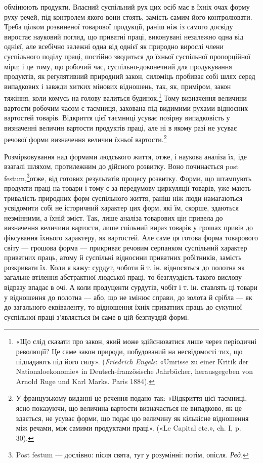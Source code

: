 \parcont{}  %
обмінюють продукти. Власний суспільний рух цих осіб має в
їхніх очах форму руху речей, під контролем якого вони стоять,
замість самим його контролювати. Треба цілком розвиненої товарової
продукції, раніш ніж із самого досвіду виростає науковий
погляд, що приватні праці, виконувані незалежно одна від однієї,
але всебічно залежні одна від однієї як природно вирослі члени
суспільного поділу праці, постійно зводиться до їхньої суспільної
пропорційної міри; і це тому, що робочий час, суспільно-доконечний
для продукування продуктів, як реґулятивний природний
закон, силоміць пробиває собі шлях серед випадкових і завжди
хитких мінових відношень, так, як, приміром, закон тяжіння,
коли комусь на голову валиться будинок.\footnote{
«Що слід сказати про закон, який може здійснюватися лише
через періодичні революції? Це саме закон природи, побудований на
несвідомості тих, що підпадають під його силу». (\emph{Friedrich Engels}: «Umrisse
zu einer Kritik der Nationaloekonomie» in Deutsch-französische
Jahrbücher, herausgegeben von Arnold Ruge und Karl Marks. Paris 1884).
} Тому визначення
величини вартости робочим часом є таємниця, захована під видимими
рухами відносних вартостей товарів. Відкриття цієї таємниці
усуває позірну випадковість у визначенні величин вартости
продуктів праці, але ні в якому разі не усуває речової форми визначення
величин їхньої вартости.\footnote*{
У французькому виданні це речення подано так: «Відкриття цієї
таємниці, ясно показуючи, що величина вартости визначається не випадково,
як це здається, не усуває форми, що подає цю величину як кількісне
відношення між речами, між самими продуктами праці». («Le Capital
etc.», ch. I, p. 30).
}

Розмірковування над формами людського життя, отже, і наукова
аналіза їх, іде взагалі шляхом, протилежним до дійсного
розвитку. Воно починається post festum,\footnote*{
Post festum — дослівно: після свята, тут у розумінні: потім,
опісля. \emph{Ред.}
}отже, від готових результатів
процесу розвитку. Форми, що штампують продукти
праці на товари і тому є за передумову циркуляції товарів, уже
мають тривалість природних форм суспільного життя, раніш ніж
люди намагаються усвідомити собі не історичний характер цих
форм, які їм, скорше, здаються незмінними, а їхній зміст. Так,
лише аналіза товарових цін привела до визначення величини вартости,
лише спільний вираз товарів у грошах привів до фіксування
їхнього характеру, як вартостей. Але саме ця готова форма
товарового світу — грошова форма — прикриває речовим серпанком
суспільний характер приватних праць, атому й суспільні
відносини приватних робітників, замість розкривати їх. Коли я
кажу: сурдут, чоботи й т. ін. відносяться до полотна як загальне
втілення абстрактної людської праці, то безглуздість такого
вислову відразу впадає в очі. А коли продуценти сурдутів, чобіт
і т. ін. ставлять ці товари у відношення до полотна — або, що не
змінює справи, до золота й срібла — як до загального еквіваленту,
то відношення їхніх приватних праць до сукупної суспільної
праці з’являється їм саме в цій безглуздій формі.
